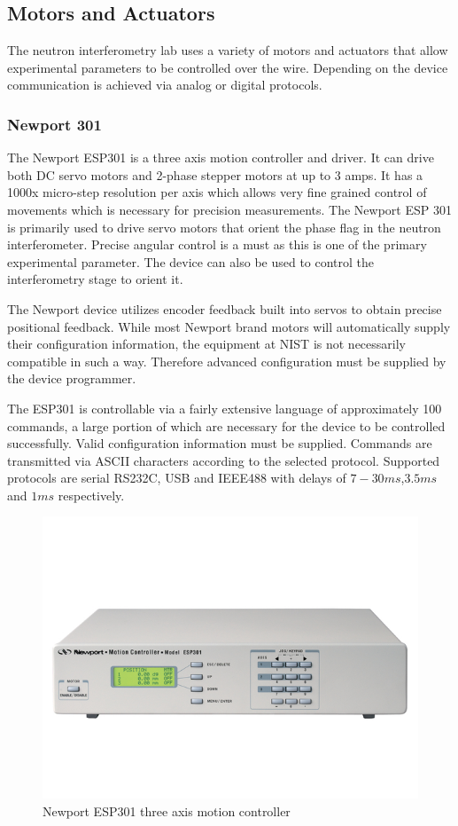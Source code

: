 \subsection{Motors and Actuators}
The neutron interferometry lab uses a variety of motors and actuators that allow experimental parameters to be controlled over the wire. Depending on the device communication is achieved via analog or digital protocols.
\subsubsection{Newport 301}

The Newport ESP301 is a three axis motion controller and driver.\cite{esp301manual} It can drive both DC servo motors and 2-phase stepper motors at up to 3 amps. It has a 1000x micro-step resolution per axis which allows very fine grained control of movements which is necessary for precision measurements. The Newport ESP 301 is primarily used to drive servo motors that orient the phase flag in the neutron interferometer. Precise angular control is a must as this is one of the primary experimental parameter. The device can also be used to control the interferometry stage to orient it. 

The Newport device utilizes encoder feedback built into servos to obtain precise positional feedback. While most Newport brand motors will automatically supply their configuration information, the equipment at NIST is not necessarily compatible in such a way. Therefore advanced configuration must be supplied by the device programmer. 

The ESP301 is controllable via a fairly extensive language of approximately 100 commands, a large portion of which are necessary for the device to be controlled successfully. Valid configuration information must be supplied. Commands are transmitted via ASCII characters according to the selected protocol. Supported protocols are serial RS232C, USB and IEEE488 with delays of $7-30ms$,$3.5ms$ and $1ms$ respectively.

\begin{figure}[ht!]
\centering
\includegraphics[scale=0.5]{Figures/esp301.jpg}
\caption{Newport ESP301 three axis motion controller}
\label{fig:esp301}
\end{figure}
